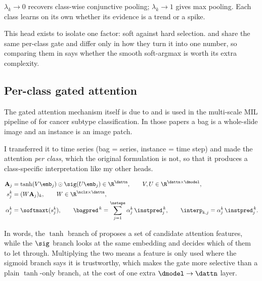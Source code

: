\begin{property}
\label{prop:attnmax}
$\lambda_k \to 0$ recovers class-wise conjunctive pooling; $\lambda_k \to 1$ gives max pooling. Each
class learns on its own whether its evidence is a trend or a spike.
\end{property}

This head exists to isolate one factor: soft against hard selection.  and
 share the same per-class gate and differ only in how they turn it into one number,
so comparing them in  says whether the smooth soft-argmax is worth its extra
complexity.

\subsection{Per-class gated attention}
\label{sec:pool:gated}

\begin{priorwork}
The gated attention mechanism itself is due to \citet{ilse2018attention} and is used in the
multi-scale MIL pipeline of \citet{hashimoto2020msdamil} for cancer subtype classification. In those
papers a bag is a whole-slide image and an instance is an image patch.
\end{priorwork}

\begin{contribution}
I transferred it to time series (bag = series, instance = time step) and made the attention
\emph{per class}, which the original formulation is not, so that it produces a class-specific
interpretation like my other heads.
\end{contribution}

\begin{align}
  \mathbf{A}_j &= \tanh(V \emb_j) \odot \sig(U \emb_j) \in \R^{\dattn},
  \qquad V, U \in \R^{\dattn \times \dmodel},
  \label{eq:ga_features}\\
  s_j^k &= (W \mathbf{A}_j)_k, \qquad W \in \R^{\nclz \times \dattn},
  \label{eq:ga_score}\\
  \alpha_j^k &= \softmaxt(s_j^k),
  \qquad
  \bagpred^{\,k} = \sum_{j=1}^{\nsteps} \alpha_j^k \, \instpred_j^{\,k},
  \qquad
  \interp_{k,j} = \alpha_j^k \, \instpred_j^{\,k}.
  \label{eq:ga_bag}
\end{align}

In words, the $\tanh$ branch of  proposes a set of candidate attention
features, while the $\sig$ branch looks at the same embedding and decides which of them to let
through. Multiplying the two means a feature is only used where the sigmoid branch says it is
trustworthy, which makes the gate more selective than a plain $\tanh$-only branch, at the cost of
one extra $\dmodel \to \dattn$ layer.

